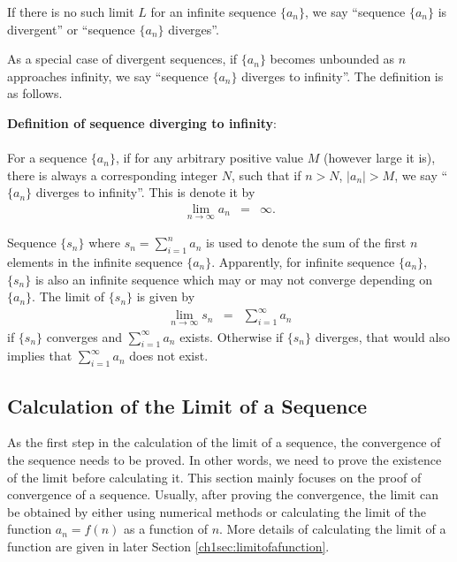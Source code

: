 If there is no such limit $L$ for an infinite sequence $\{a_n\}$, we say ``sequence $\{a_n\}$ is divergent'' or ``sequence $\{a_n\}$ diverges''.

As a special case of divergent sequences, if $\{a_n\}$ becomes unbounded as $n$ approaches infinity, we say ``sequence $\{a_n\}$ diverges to infinity''. The definition is as follows.
\begin{VF}
\textbf{Definition of sequence diverging to infinity}:
\\
\\
\noindent For a sequence $\{a_n\}$, if for any arbitrary positive value $M$ (however large it is), there is always a corresponding integer $N$, such that if $n>N$, $|a_n|>M$, we say ``$\{a_n\}$ diverges to infinity''. This is denote it by
\begin{eqnarray}
  \lim_{n\rightarrow \infty}a_n &=& \infty. \nonumber
\end{eqnarray}
\end{VF}

Sequence $\{s_n\}$ where $s_n=\sum_{i=1}^{n}a_n$ is used to denote the sum of the first $n$ elements in the infinite sequence $\{a_n\}$. Apparently, for infinite sequence $\{a_n\}$, $\{s_n\}$ is also an infinite sequence which may or may not converge depending on $\{a_n\}$. The limit of $\{s_n\}$ is given by
\begin{eqnarray}
  \lim_{n\rightarrow\infty}s_n &=& \sum_{i=1}^{\infty} a_n \nonumber
\end{eqnarray}
if $\{s_n\}$ converges and $\sum_{i=1}^{\infty} a_n$ exists. Otherwise if $\{s_n\}$ diverges, that would also implies that $\sum_{i=1}^{\infty} a_n$ does not exist.

\subsection{Calculation of the Limit of a Sequence} \label{chisubsec:proofofsequenceconvergence}

As the first step in the calculation of the limit of a sequence, the convergence of the sequence needs to be proved. In other words, we need to prove the existence of the limit before calculating it. This section mainly focuses on the proof of convergence of a sequence. Usually, after proving the convergence, the limit can be obtained by either using numerical methods or calculating the limit of the function $a_n=f(n)$ as a function of $n$. More details of calculating the limit of a function are given in later Section \ref{ch1sec:limitofafunction}.

